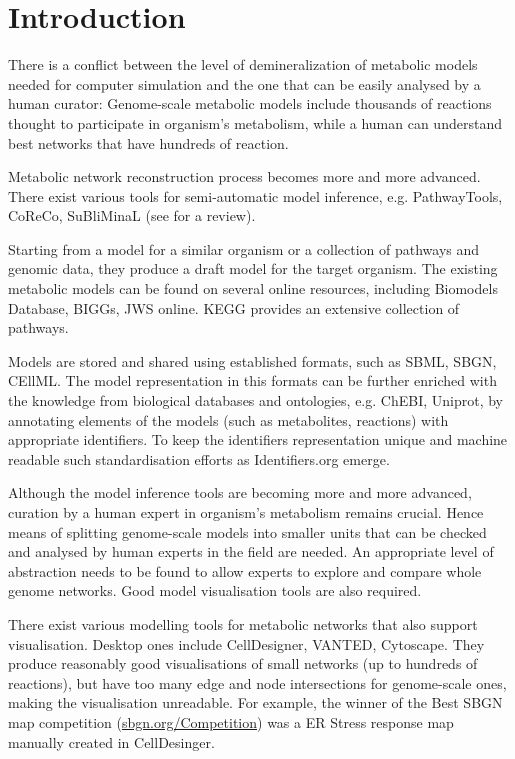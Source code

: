 \documentclass{bioinfo}
\begin{document}
\section{Introduction}

There is a conflict between the level of demineralization of metabolic models needed for computer simulation and the one that can be easily analysed by a human curator: Genome-scale metabolic models include thousands of reactions thought to participate in organism's metabolism, while a human can understand best networks that have hundreds of reaction.

Metabolic network reconstruction process becomes more and more advanced. There exist various tools for semi-automatic model inference, e.g. PathwayTools\cite{Karp2002}, CoReCo\cite{Pitkanen2014}, SuBliMinaL\cite{Swainston2011} (see \cite{Hamilton2014} for a review).

Starting from a model for a similar organism or a collection of pathways and genomic data, they produce a draft model for the target organism. The existing metabolic models can be found on several online resources, including Biomodels Database\cite{Li10}, BIGGs\cite{Schellenberger2010}, JWS online\cite{Snoep2003}. KEGG\cite{Kanehisa12} provides an extensive collection of pathways. 

Models are stored and shared using established formats, such as SBML\cite{Hucka2003}, SBGN\cite{Moodie2011}, CEllML\cite{Lloyd2004}. The model representation in this formats can be further enriched with the knowledge from biological databases and ontologies, e.g. ChEBI\cite{deMatos10}, Uniprot\cite{TheUniProtConsortium2013}, by annotating elements of the models (such as metabolites, reactions) with appropriate identifiers. To keep the identifiers representation unique and machine readable such standardisation efforts as Identifiers.org\cite{Juty2012} emerge.


Although the model inference tools are becoming more and more advanced, curation by a human expert in organism's metabolism remains crucial. Hence means of splitting genome-scale models into smaller units that can be checked and analysed by human experts in the field are needed. An appropriate level of abstraction needs to be found to allow experts to explore and compare whole genome networks. Good model visualisation tools are also required.

There exist various modelling tools for metabolic networks that also support visualisation. Desktop ones include CellDesigner\cite{Funahashi2008}, VANTED\cite{Rohn2012}, Cytoscape\cite{Smoot2011}. They produce reasonably good visualisations of small networks (up to hundreds of reactions), but have too many edge and node intersections for genome-scale ones, making the visualisation unreadable. For example,  the winner of the Best SBGN map competition (\href{http://www.sbgn.org/Competition/Competition_2011/}{sbgn.org/Competition}) was a ER Stress response\cite{Groenendyk2010} map manually created in CellDesinger.
\end{document}
